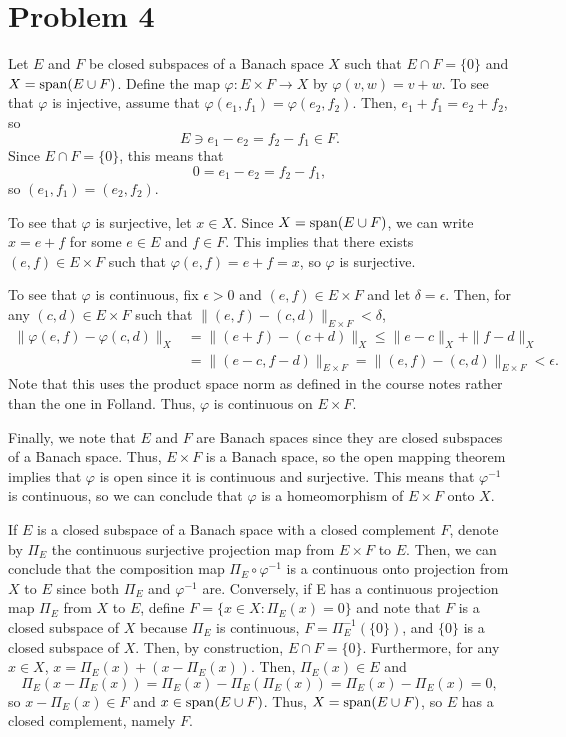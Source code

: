 \documentclass{article}
\begin{document}
\section{Problem 4}
Let $E$ and $F$ be closed subspaces of a Banach space $X$ such that $E\cap F=\{0\}$ and $X=\operatorname{span}(E\cup F)$. Define the map $\varphi:E\times F\to X$ by $\varphi(v,w)=v+w$. To see that $\varphi$ is injective, assume that $\varphi(e_1,f_1)=\varphi(e_2,f_2)$. Then, $e_1+f_1=e_2+f_2$, so
\[
E\ni e_1-e_2=f_2-f_1\in F.
\]
Since $E\cap F=\{0\}$, this means that
\[
0=e_1-e_2=f_2-f_1,
\]
so $(e_1,f_1)=(e_2,f_2)$.

To see that $\varphi$ is surjective, let $x\in X$. Since $X=\operatorname{span}(E\cup F)$, we can write $x=e+f$ for some $e\in E$ and $f\in F$. This implies that there exists $(e,f)\in E\times F$ such that $\varphi(e,f)=e+f=x$, so $\varphi$ is surjective.

To see that $\varphi$ is continuous, fix $\epsilon>0$ and $(e,f)\in E\times F$ and let $\delta=\epsilon$. Then, for any $(c,d)\in E\times F$ such that $\|(e,f)-(c,d)\|_{E\times F}<\delta$, 
\begin{align*}
\|\varphi(e,f)-\varphi(c,d)\|_X&=\|(e+f)-(c+d)\|_X\leq \|e-c\|_X+\|f-d\|_X\\&=\|(e-c,f-d)\|_{E\times F}=\|(e,f)-(c,d)\|_{E\times F}<\epsilon.
\end{align*}
Note that this uses the product space norm as defined in the course notes rather than the one in Folland. Thus, $\varphi$ is continuous on $E\times F$. 

Finally, we note that $E$ and $F$ are Banach spaces since they are closed subspaces of a Banach space. Thus, $E\times F$ is a Banach space, so the open mapping theorem implies that $\varphi$ is open since it is continuous and surjective. This means that $\varphi^{-1}$ is continuous, so we can conclude that $\varphi$ is a homeomorphism of $E\times F$ onto $X$. 

If $E$ is a closed subspace of a Banach space with a closed complement $F$, denote by $\Pi_E$ the continuous surjective projection map from $E\times F$ to $E$. Then, we can conclude that the composition map $\Pi_E\circ\varphi^{-1}$ is a continuous onto projection from $X$ to $E$ since both $\Pi_E$ and $\varphi^{-1}$ are. Conversely, if E has a continuous projection map $\Pi_E$ from $X$ to $E$, define $F=\{x\in X:\Pi_E(x)=0\}$ and note that $F$ is a closed subspace of $X$ because $\Pi_E$ is continuous, $F=\Pi_E^{-1}(\{0\})$, and $\{0\}$ is a closed subspace of $X$. Then, by construction, $E\cap F=\{0\}$. Furthermore, for any $x\in X$, $x=\Pi_E(x)+(x-\Pi_E(x))$. Then, $\Pi_E(x)\in E$ and 
\[
\Pi_E(x-\Pi_E(x))=\Pi_E(x)-\Pi_E(\Pi_E(x))=\Pi_E(x)-\Pi_E(x)=0,
\]
so $x-\Pi_E(x)\in F$ and $x\in\operatorname{span}(E\cup F)$. Thus, $X=\operatorname{span}(E\cup F)$, so $E$ has a closed complement, namely $F$.
\end{document}
